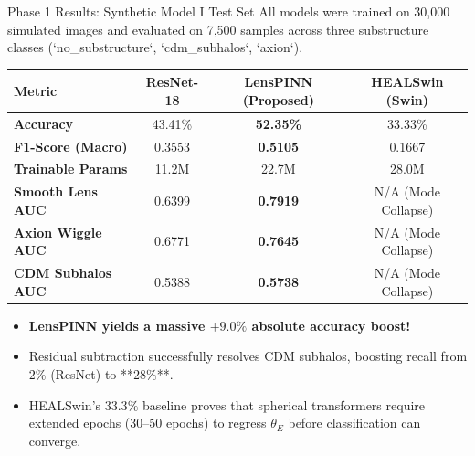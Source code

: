 \documentclass[10pt]{beamer}
\begin{document}
\begin{frame}{Phase 1 Results: Synthetic Model I Test Set}
    All models were trained on 30,000 simulated images and evaluated on 7,500 samples across three substructure classes (`no\_substructure`, `cdm\_subhalos`, `axion`).
    \vspace{0.2cm}
    \begin{table}
        \centering
        \small
        \begin{tabular}{lccc}
            \toprule
            \textbf{Metric} & \textbf{ResNet-18} & \textbf{LensPINN (Proposed)} & \textbf{HEALSwin (Swin)} \\
            \midrule
            \textbf{Accuracy} & 43.41\% & \textbf{52.35\%} & 33.33\% \\
            \textbf{F1-Score (Macro)} & 0.3553 & \textbf{0.5105} & 0.1667 \\
            \textbf{Trainable Params} & 11.2M & 22.7M & 28.0M \\
            \textbf{Smooth Lens AUC} & 0.6399 & \textbf{0.7919} & N/A (Mode Collapse) \\
            \textbf{Axion Wiggle AUC} & 0.6771 & \textbf{0.7645} & N/A (Mode Collapse) \\
            \textbf{CDM Subhalos AUC} & 0.5388 & \textbf{0.5738} & N/A (Mode Collapse) \\
            \bottomrule
        \end{tabular}
    \end{table}
    \vspace{0.1cm}
    \begin{itemize}
        \item \textbf{LensPINN yields a massive $+9.0\%$ absolute accuracy boost!}
        \item Residual subtraction successfully resolves CDM subhalos, boosting recall from $2\%$ (ResNet) to **$28\%$**.
        \item HEALSwin's $33.3\%$ baseline proves that spherical transformers require extended epochs (30--50 epochs) to regress $\theta_E$ before classification can converge.
    \end{itemize}
\end{frame}
\end{document}
